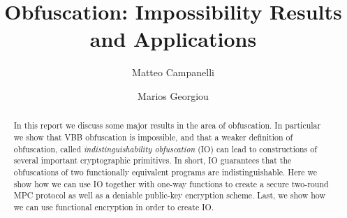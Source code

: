 \documentclass[]{article}
\title{Obfuscation: Impossibility Results and Applications}
\author{Matteo Campanelli \and Marios Georgiou}
\begin{document}
\maketitle

\begin{abstract}
In this report we discuss some major results in the area of obfuscation. In particular we show that VBB obfuscation is impossible, and that a weaker definition of obfuscation, called \emph{indistinguishability obfuscation} (IO) can lead to constructions of several important cryptographic primitives. In short, IO guarantees that the obfuscations of two functionally equivalent programs are indistinguishable. Here we show how we can use IO together with one-way functions to create a secure two-round MPC protocol as well as a deniable public-key encryption scheme. Last, we show how we can use functional encryption in order to create IO.

\end{abstract}














{}

\end{document}
